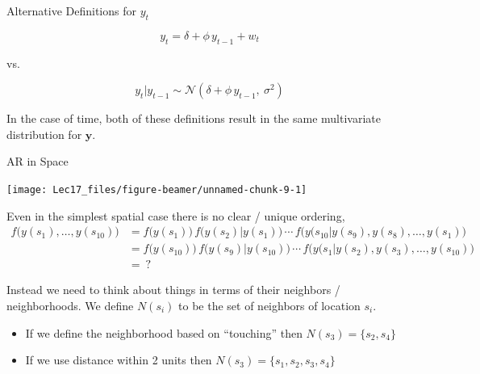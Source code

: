 \documentclass[11pt,ignorenonframetext,]{beamer}
\begin{document}
\begin{frame}{Alternative Definitions for \(y_t\)}
\protect\hypertarget{alternative-definitions-for-y_t}{}

\Large

\[ y_t = \delta + \phi \, y_{t-1} + w_t \]

\vspace{2mm}

\begin{center}vs.\end{center}

\vspace{2mm}

\[ y_t | y_{t-1} \sim \mathcal{N}(\delta + \phi \, y_{t-1},~\sigma^2) \]

\pause

\vspace{3mm}
\normalsize

In the case of time, both of these definitions result in the same
multivariate distribution for \(\symbf{y}\).

\end{frame}

\begin{frame}[t]{AR in Space}
\protect\hypertarget{ar-in-space}{}

\vspace{4mm}

\begin{center}\texttt{[image: Lec17\_files/figure-beamer/unnamed-chunk-9-1]} \end{center}

\pause

Even in the simplest spatial case there is no clear / unique ordering,
\scriptsize \[ \begin{aligned}
f\big(y(s_1), \ldots, y(s_{10})\big) 
  &= f\big(y(s_1)\big) \, f\big(y(s_2) | y(s_1)\big) \, \cdots \, f\big(y(s_{10} | y(s_{9}),y(s_{8}),\ldots,y(s_1)\big)  \\
  &= f\big(y(s_{10})\big) \, f\big(y(s_9) | y(s_{10})\big) \, \cdots \, f\big(y(s_{1} | y(s_{2}),y(s_{3}),\ldots,y(s_{10})\big)  \\
  &= ~?
\end{aligned} \] \normalsize

\pause

Instead we need to think about things in terms of their neighbors /
neighborhoods. We define \(N(s_i)\) to be the set of neighbors of
location \(s_i\).

\begin{itemize}
\item
  If we define the neighborhood based on ``touching'' then
  \(N(s_3) = \{s_2, s_4\}\)
\item
  If we use distance within 2 units then
  \(N(s_3) = \{s_1,s_2,s_3,s_4\}\)
\end{itemize}

\end{frame}
\end{document}
